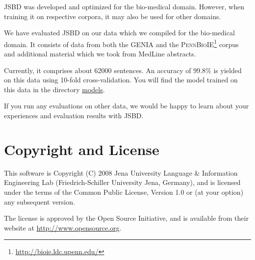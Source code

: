 \documentclass[11pt,a4paper,halfparskip]{scrartcl}
\begin{document}
JSBD was developed and optimized for the bio-medical domain. However,
when training it on respective corpora, it may also be used for other
domains.

We have evaluated JSBD on our data which we compiled for the
bio-medical domain. It consists of data from both the GENIA
\cite{ohta02} and the
\textsc{PennBioIE}\footnote{\url{http://bioie.ldc.upenn.edu/}} corpus
and additional material which we took from MedLine abstracts.

Currently, it comprises about 62000 sentences. An accuracy of 99.8\% is
yielded on this data using 10-fold cross-validation.  You will find
the model trained on this data in the directory \url{models}.

If you run any evaluations on other data, we would be happy to learn
about your experiences and evaluation results with JSBD.





\section{Copyright and License}
This software is Copyright (C) 2008 Jena University Language \& Information
Engineering Lab (Friedrich-Schiller University Jena, Germany), and is
licensed under the terms of the Common Public License, Version 1.0 or (at
your option) any subsequent version.

The license is approved by the Open Source Initiative, and is
available from their website at \url{http://www.opensource.org}.



\end{document}
